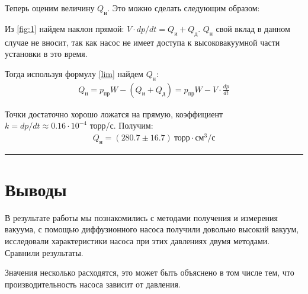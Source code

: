 \documentclass[a4paper,12pt]{report}
\begin{document}
\begin{multicols}{2}
        Теперь оценим величину $Q_\text{н}$. Это можно сделать следующим образом:

        Из \ref{fig:1} найдем наклон прямой: $V\cdot dp/dt=Q_\text{и}+Q_\text{д}$. $Q_\text{н}$ свой вклад в данном случае не вносит, так как насос не имеет доступа к высоковакуумной части установки в это время.

        Тогда используя формулу \eqref{lim} найдем $Q_\text{н}$:
        \begin{gather}
            Q_\text{н}=p_\text{пр}W-(Q_\text{и}+Q_\text{д})=p_\text{пр}W-V\cdot \frac{dp}{dt}
        \end{gather}

        Точки достаточно хорошо ложатся на прямую, коэффициент $k=dp/dt\approx 0.16\cdot 10^{-4}$ торр/с. Получим:
        \begin{gather*}
            Q_\text{н}=(280.7\pm 16.7)\  \text{торр}\cdot\text{см}^3/\text{с}
        \end{gather*}
    \end{multicols}

    \hrule

    \section{Выводы}

    \begin{multicols}{2}
        В результате работы мы познакомились с методами получения и измерения вакуума, с помощью диффузионного насоса получили довольно высокий вакуум, исследовали характеристики насоса при этих давлениях двумя методами. Сравнили результаты.

        Значения несколько расходятся, это может быть объяснено в том числе тем, что производительность насоса зависит от давления.
    \end{multicols}
\end{document}
